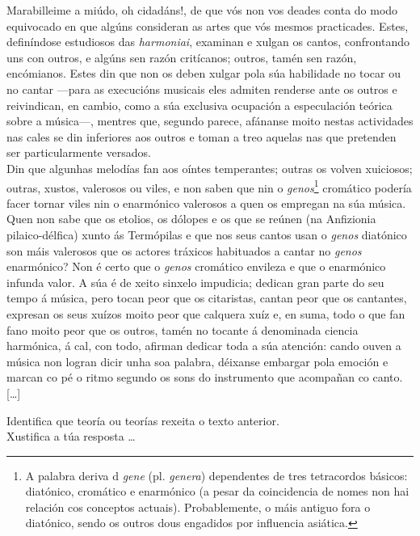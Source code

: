 \begin{multicols}{3}
\setlength{\columnseprule}{1pt}
{\small
\noindent
Marabilleime a miúdo, oh cidadáns!, de que vós non vos deades conta do modo equivocado en que algúns consideran as artes que vós mesmos practicades. Estes, definíndose estudiosos das \emph{harmoniai}, examinan e xulgan os cantos, confrontando uns con outros, e algúns sen razón critícanos; outros, tamén sen razón, encómianos. Estes din que non os deben xulgar pola súa habilidade no tocar ou no cantar ---para as execucións musicais eles admiten renderse ante os outros e reivindican, en cambio, como a súa exclusiva ocupación a especulación teórica sobre a música---, mentres que, segundo parece, afánanse moito nestas actividades nas cales se din inferiores aos outros e toman a treo aquelas nas que pretenden ser particularmente versados.\\
Din que algunhas melodías fan aos oíntes temperantes; outras os volven xuiciosos; outras, xustos, valerosos ou viles, e non saben que nin o \emph{genos}\footnote{A palabra deriva d \emph{gene} (pl. \emph{genera}) dependentes de tres tetracordos básicos: diatónico, cromático e enarmónico (a pesar da coincidencia de nomes non hai relación cos conceptos
actuais). Probablemente, o máis antiguo fora o diatónico, sendo os outros dous engadidos por influencia asiática.} cromático podería facer tornar viles nin o enarmónico valerosos a quen os empregan na súa música. Quen non sabe que os etolios, os dólopes e os que se reúnen (na Anfizionia pilaico-délfica) xunto ás Termópilas e que nos seus cantos usan o \emph{genos} diatónico son máis valerosos que os actores tráxicos habituados a cantar no \emph{genos} enarmónico? Non é certo que o \emph{genos} cromático envileza e que o enarmónico infunda valor. A súa é de xeito sinxelo impudicia; dedican gran parte do seu tempo á música, pero tocan peor que os citaristas, cantan peor que os cantantes, expresan os seus xuízos moito peor que calquera xuíz e, en suma, todo o que fan fano moito peor que os outros, tamén no tocante á denominada ciencia harmónica, á cal, con todo, afirman dedicar toda a súa atención: cando ouven a música non logran dicir unha soa palabra, déixanse embargar pola emoción e marcan co pé o ritmo segundo os sons do instrumento que acompañan co canto. [\ldots]
}
\end{multicols}


\begin{ejercicio}[]
Identifica que teoría ou teorías rexeita o texto anterior.\\
Xustifica a túa resposta \ldots
 \vspace*{2.0cm} %
\end{ejercicio}
%

